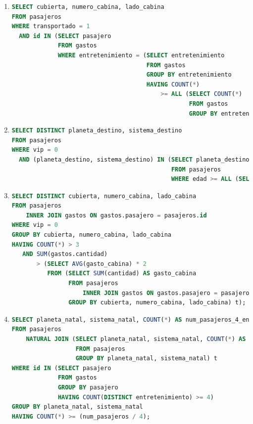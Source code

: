 \documentclass{db-practice}
\begin{document}
\begin{enumerate}
\item
\begin{lstlisting}[language=SQL]
SELECT cubierta, numero_cabina, lado_cabina
FROM pasajeros
WHERE transportado = 1
  AND id IN (SELECT pasajero
             FROM gastos
             WHERE entretenimiento = (SELECT entretenimiento
                                      FROM gastos
                                      GROUP BY entretenimiento
                                      HAVING COUNT(*) 
                                          >= ALL (SELECT COUNT(*)
                                                  FROM gastos
                                                  GROUP BY entretenimiento)));
\end{lstlisting}

\item
\begin{lstlisting}[language=SQL]
SELECT DISTINCT planeta_destino, sistema_destino
FROM pasajeros
WHERE vip = 0
  AND (planeta_destino, sistema_destino) IN (SELECT planeta_destino, sistema_destino
                                             FROM pasajeros
                                             WHERE edad >= ALL (SELECT edad FROM pasajeros));
\end{lstlisting}

\item
\begin{lstlisting}[language=SQL]
SELECT DISTINCT cubierta, numero_cabina, lado_cabina
FROM pasajeros
    INNER JOIN gastos ON gastos.pasajero = pasajeros.id
WHERE vip = 0
GROUP BY cubierta, numero_cabina, lado_cabina
HAVING COUNT(*) > 3
   AND SUM(gastos.cantidad) 
       > (SELECT AVG(gasto_cabina) * 2
          FROM (SELECT SUM(cantidad) AS gasto_cabina
                FROM pasajeros
                    INNER JOIN gastos ON gastos.pasajero = pasajeros.id
                GROUP BY cubierta, numero_cabina, lado_cabina) t);
\end{lstlisting}

\item
\begin{lstlisting}[language=SQL]
SELECT planeta_natal, sistema_natal, COUNT(*) AS num_pasajeros_4_ent, num_pasajeros
FROM pasajeros
	NATURAL JOIN (SELECT planeta_natal, sistema_natal, COUNT(*) AS num_pasajeros
                  FROM pasajeros
                  GROUP BY planeta_natal, sistema_natal) t
WHERE id IN (SELECT pasajero 
             FROM gastos 
             GROUP BY pasajero 
             HAVING COUNT(DISTINCT entretenimiento) >= 4)
GROUP BY planeta_natal, sistema_natal
HAVING COUNT(*) >= (num_pasajeros / 4);

\end{lstlisting}
\end{enumerate}
\end{document}
